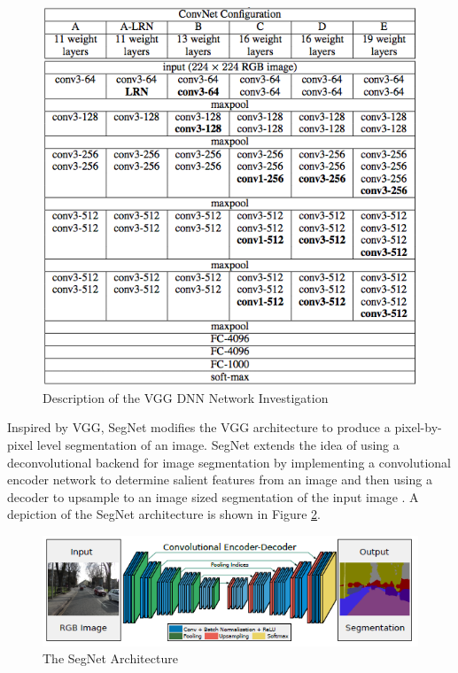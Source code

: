 \documentclass[letterpaper, 10 pt, conference]{ieeeconf}  %
\begin{document}
\begin{figure}
  \includegraphics[width=\linewidth]{images/VGG.png}
  \caption{Description of the VGG DNN Network Investigation}
   \label{fig:VGG}
\end{figure}

Inspired by VGG, SegNet modifies the VGG architecture to produce a pixel-by-pixel level segmentation of an image. SegNet extends the idea of using a deconvolutional backend for image segmentation by implementing a convolutional encoder network to determine salient features from an image and then using a decoder to upsample to an image sized segmentation of the input image \cite{badrinarayanan_segnet:_2015}. A depiction of the SegNet architecture is shown in Figure \ref{fig:segnet}.

\begin{figure}
  \includegraphics[width=\linewidth]{images/segnet.png}
  \caption{The SegNet Architecture \cite{badrinarayanan_segnet:_2015}}
   \label{fig:segnet}
\end{figure}
\end{document}
